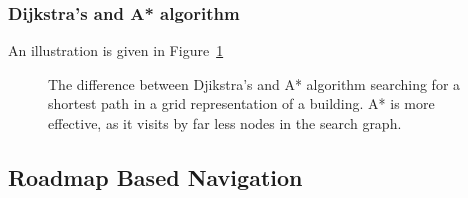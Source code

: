 \subsubsection{Dijkstra's and A* algorithm}
An illustration is given in Figure~\ref{fig:fig_overview}
\begin{figure}[thpb]
	  \myfloatalign
      \footnotesize
      \centering
    
   \caption[Djikstra's and A* algorithm.]{The difference between Djikstra's and A* algorithm searching for a shortest path in a grid representation of a building. A* is more effective, as it visits by far less nodes in the search graph. }
   \label{fig:fig_overview}
\end{figure}
\subsection{Roadmap Based Navigation}
